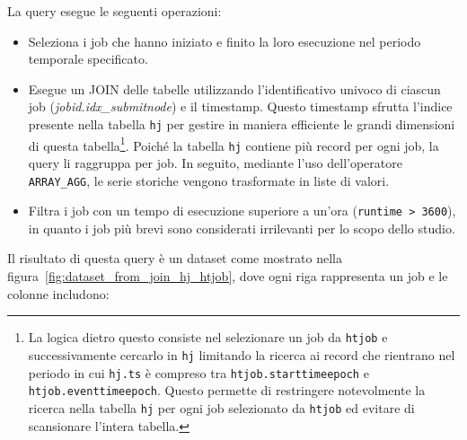 

La query esegue le seguenti operazioni:
\begin{itemize}
    \item Seleziona i job che hanno iniziato e finito la loro esecuzione nel
        periodo temporale specificato.
    \item Esegue un JOIN delle tabelle utilizzando l'identificativo univoco di
        ciascun job (\textit{jobid.idx\_submitnode}) e il timestamp. Questo
        timestamp sfrutta l'indice presente nella tabella
        \texttt{hj} per gestire in maniera efficiente le grandi dimensioni di
        questa tabella\footnote{La logica dietro questo consiste
            nel selezionare un job da \texttt{htjob} e successivamente
            cercarlo in \texttt{hj} limitando la ricerca ai record che
            rientrano nel periodo in cui \texttt{hj.ts} è compreso tra
            \texttt{htjob.starttimeepoch} e \texttt{htjob.eventtimeepoch}.
            Questo permette di restringere notevolmente la ricerca nella
            tabella \texttt{hj} per ogni job selezionato da \texttt{htjob} ed
        evitare di scansionare l'intera tabella.}. Poiché la tabella \texttt{hj} contiene più record per
        ogni job, la query li raggruppa per job. In seguito, mediante l'uso
        dell'operatore \verb|ARRAY_AGG|, le serie storiche vengono trasformate
        in liste di valori.
    \item Filtra i job con un tempo di esecuzione superiore a un'ora
        (\verb|runtime > 3600|), in quanto i job più brevi sono considerati
        irrilevanti per lo scopo dello studio.
\end{itemize}

Il risultato di questa query è un dataset come mostrato nella
figura~\ref{fig:dataset_from_join_hj_htjob}, dove ogni riga rappresenta un job
e le colonne includono: 

